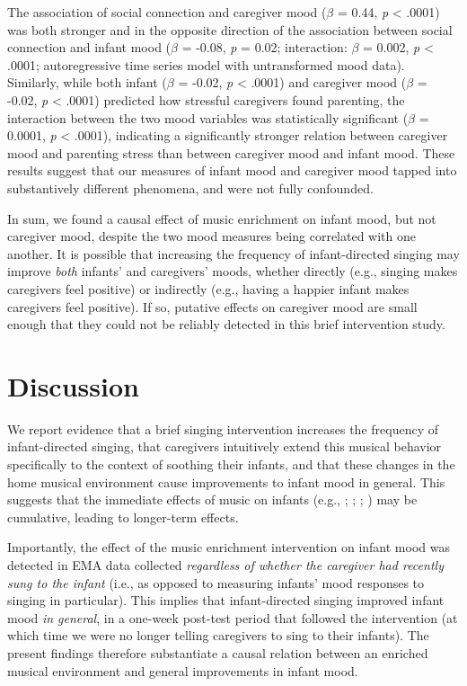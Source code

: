 \documentclass[
]{article}
\begin{document}
The association of social connection and caregiver mood (\(\beta\) =
0.44, \emph{p} \textless{} .0001) was both stronger and in the opposite
direction of the association between social connection and infant mood
(\(\beta\) = -0.08, \emph{p} = 0.02; interaction: \(\beta\) = 0.002,
\emph{p} \textless{} .0001; autoregressive time series model with
untransformed mood data). Similarly, while both infant (\(\beta\) =
-0.02, \emph{p} \textless{} .0001) and caregiver mood (\(\beta\) =
-0.02, \emph{p} \textless{} .0001) predicted how stressful caregivers
found parenting, the interaction between the two mood variables was
statistically significant (\(\beta\) = 0.0001, \emph{p} \textless{}
.0001), indicating a significantly stronger relation between caregiver
mood and parenting stress than between caregiver mood and infant mood.
These results suggest that our measures of infant mood and caregiver
mood tapped into substantively different phenomena, and were not fully
confounded.

In sum, we found a causal effect of music enrichment on infant mood, but
not caregiver mood, despite the two mood measures being correlated with
one another. It is possible that increasing the frequency of
infant-directed singing may improve \emph{both} infants' and caregivers'
moods, whether directly (e.g., singing makes caregivers feel positive)
or indirectly (e.g., having a happier infant makes caregivers feel
positive). If so, putative effects on caregiver mood are small enough
that they could not be reliably detected in this brief intervention
study.

\section{Discussion}\label{discussion}

We report evidence that a brief singing intervention increases the
frequency of infant-directed singing, that caregivers intuitively extend
this musical behavior specifically to the context of soothing their
infants, and that these changes in the home musical environment cause
improvements to infant mood in general. This suggests that the immediate
effects of music on infants (e.g.,
;
;
;
) may be cumulative,
leading to longer-term effects.

Importantly, the effect of the music enrichment intervention on infant
mood was detected in EMA data collected \emph{regardless of whether the
caregiver had recently sung to the infant} (i.e., as opposed to
measuring infants' mood responses to singing in particular). This
implies that infant-directed singing improved infant mood \emph{in
general}, in a one-week post-test period that followed the intervention
(at which time we were no longer telling caregivers to sing to their
infants). The present findings therefore substantiate a causal relation
between an enriched musical environment and general improvements in
infant mood.
\end{document}
